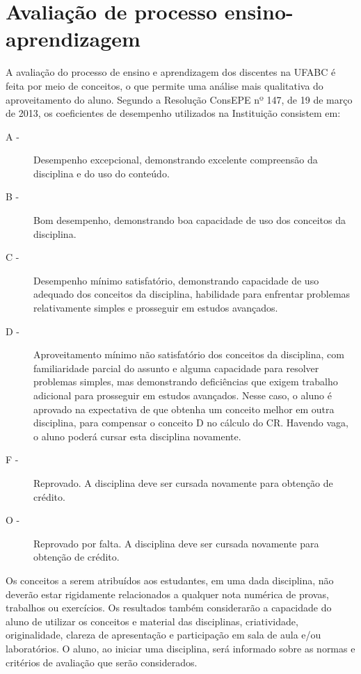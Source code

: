 \section{Avaliação de processo ensino-aprendizagem}
\label{sec:avaliacao_ensino_aprendizagem}

A avaliação do processo de ensino e aprendizagem dos discentes na UFABC é feita
por meio de conceitos, o que permite uma análise mais qualitativa do
aproveitamento do aluno.
Segundo a Resolução ConsEPE nº 147, de 19 de março de 2013, os coeficientes de
desempenho utilizados na Instituição consistem em:
\begin{description}
    \item[A -] Desempenho excepcional, demonstrando excelente compreensão da
    disciplina e do uso do conteúdo.
    \item[B -] Bom desempenho, demonstrando boa capacidade de uso dos conceitos
    da disciplina.
    \item[C -] Desempenho mínimo satisfatório, demonstrando capacidade de uso
    adequado dos conceitos da disciplina, habilidade para enfrentar problemas
    relativamente simples e prosseguir em estudos avançados.
    \item[D -] Aproveitamento mínimo não satisfatório dos conceitos da
    disciplina, com familiaridade parcial do assunto e alguma capacidade para
    resolver problemas simples, mas demonstrando deficiências que exigem
    trabalho adicional para prosseguir em estudos avançados. Nesse caso, o
    aluno é aprovado na expectativa de que obtenha um conceito melhor em outra
    disciplina, para compensar o conceito D no cálculo do CR. Havendo vaga, o
    aluno poderá cursar esta disciplina novamente.
    \item[F -] Reprovado. A disciplina deve ser cursada novamente para obtenção
    de crédito.
    \item[O -] Reprovado por falta. A disciplina deve ser cursada novamente
    para obtenção de crédito.
\end{description}

Os conceitos a serem atribuídos aos estudantes, em uma dada disciplina, não
deverão estar rigidamente relacionados a qualquer nota numérica de provas,
trabalhos ou exercícios.
Os resultados também considerarão a capacidade do aluno de utilizar os
conceitos e material das disciplinas, criatividade, originalidade, clareza de
apresentação e participação em sala de aula e/ou laboratórios. 
O aluno, ao iniciar uma disciplina, será informado sobre as normas e critérios
de avaliação que serão considerados.

